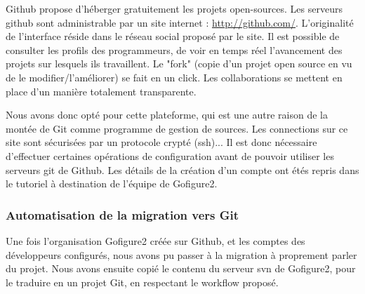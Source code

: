 Github propose d'héberger gratuitement les projets open-sources. Les serveurs github sont administrable par un site
internet : \url{http://github.com/}. L'originalité de l'interface réside dans le réseau social proposé par le site. Il est possible de consulter les profils des programmeurs, de voir en temps réel l'avancement des projets sur lesquels ils travaillent. Le "fork" (copie d'un projet open source en vu de le modifier/l'améliorer) se fait en un click. Les collaborations se mettent en place d'un manière totalement transparente.

Nous avons donc opté pour cette plateforme, qui est une autre raison de la montée de Git comme programme de gestion de sources. Les connections sur ce site sont sécurisées par un protocole crypté (ssh)... Il est donc nécessaire d'effectuer certaines opérations de configuration avant de pouvoir utiliser les serveurs git de Github. Les détails de la création d'un compte ont étés repris dans le tutoriel à destination de l'équipe de Gofigure2.

\subsubsection{Automatisation de la migration vers Git}

Une fois l'organisation Gofigure2 créée sur Github, et les comptes des développeurs configurés, nous avons pu passer à la migration à proprement parler du projet.
Nous avons ensuite copié le contenu du serveur svn de Gofigure2,
pour le traduire en un projet Git, en respectant le workflow proposé.

